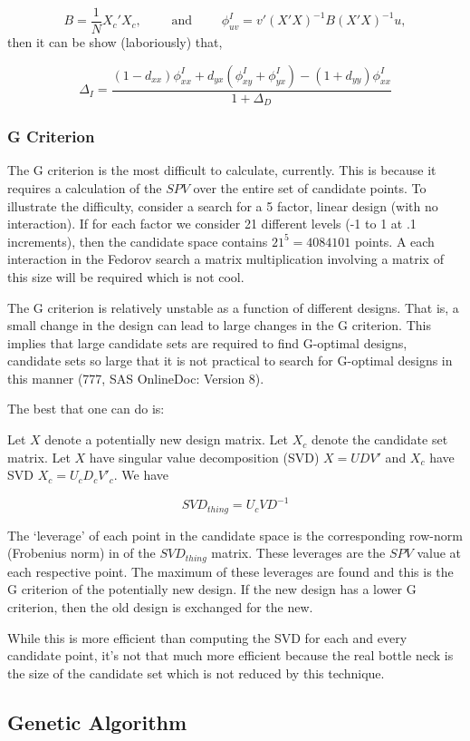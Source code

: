 \documentclass{article}\usepackage[]{graphicx}\usepackage[]{color}
\begin{document}
$$ B = \frac{1}{N}X_c'X_c, \quad\quad \mbox{ and } \quad\quad \phi^I_{uv} = v' (X'X)^{-1} B (X'X)^{-1} u,$$ then it can be show (laboriously) that,

$$ \Delta_I = \frac{(1 - d_{xx}) \phi^I_{xx} + d_{yx} (\phi^I_{xy} + \phi^I_{yx}) - (1 + d_{yy})\phi^I_{xx}}{1 + \Delta_D} $$

\subsubsection{G Criterion}
The G criterion is the most difficult to calculate, currently. This is because it requires a calculation of the $SPV$ over the entire set of candidate points. To illustrate the difficulty, consider a search for a 5 factor, linear design (with no interaction). If for each factor we consider 21 different levels (-1 to 1 at .1 increments), then the candidate space contains $21^5 = 4084101$ points. A each interaction in the Fedorov search a matrix multiplication involving a matrix of this size will be required which is not cool.

The G criterion is relatively unstable as a function of different designs. That is, a small change in the design can lead to large changes in the G criterion. This implies that large candidate sets are required to find G-optimal designs, candidate sets so large that it is not practical to search for G-optimal designs in this manner (777, SAS OnlineDoc: Version 8).

The best that one can do is:

Let $X$ denote a potentially new design matrix. Let $X_c$ denote the candidate set matrix. Let $X$ have singular value decomposition (SVD) $X = U D V'$ and $X_c$ have SVD $X_c = U_c D_c V'_c$. We have

$$ SVD_{thing} = U_c V D^{-1} $$

The `leverage' of each point in the candidate space is the corresponding row-norm (Frobenius norm) in of the $SVD_{thing}$ matrix. These leverages are the $SPV$ value at each respective point. The maximum of these leverages are found and this is the G criterion of the potentially new design. If the new design has a lower G criterion, then the old design is exchanged for the new.

While this is more efficient than computing the SVD for each and every candidate point, it's not that much more efficient because the real bottle neck is the size of the candidate set which is not reduced by this technique.

\subsection{Genetic Algorithm}
\end{document}
